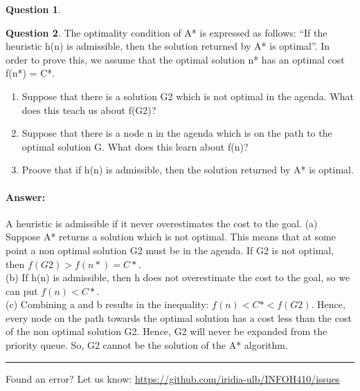 \documentclass[11pt,a4paper]{article}
\theoremstyle{definition}%
\newtheorem{Q}{Question}[] %
\newcommand{\reponse}[1]{%
\ifthenelse {\boolean{corrige}} {\paragraph{Answer:} \color{darkblue}   #1\color{black}} {}
}
\begin{document}
\begin{Q}
{}
\end{Q}


\begin{Q}
    The optimality condition of A* is expressed as follows: “If the heuristic h(n) is admissible,
then the solution returned by A* is optimal”. In order to prove this, we assume that the
optimal solution n* has an optimal cost f(n*) = C*.

\begin{enumerate}
    \item Suppose that there is a solution G2 which is not optimal in the agenda. What does
    this teach us about f(G2)?
    \item Suppose that there is a node n in the agenda which is on the path to the optimal
    solution G. What does this learn about f(n)?
    \item Proove that if h(n) is admissible, then the solution returned by A* is optimal.
\end{enumerate}
\reponse{
    A heuristic is admissible if it never overestimates the cost to the goal.
(a) Suppose A* returns a solution which is not optimal. This means that at some point a
non optimal solution G2 must be in the agenda. If G2 is not optimal, then $f(G2) >
f(n*) = C*$.\\
(b) If h(n) is admissible, then h does not overestimate the cost to the goal, so we can put
$f(n) < C*$.\\
(c) Combining a and b results in the inequality: $f(n) < C* < f(G2)$. Hence, every node
on the path towards the optimal solution has a cost less than the cost of the non
optimal solution G2. Hence, G2 will never be expanded from the priority queue. So,
G2 cannot be the solution of the A* algorithm.
}
\end{Q}


\noindent
\rule{\textwidth}{0.4pt}
\footnotesize{Found an error? Let us know: \url{https://github.com/iridia-ulb/INFOH410/issues}}
\end{document}
